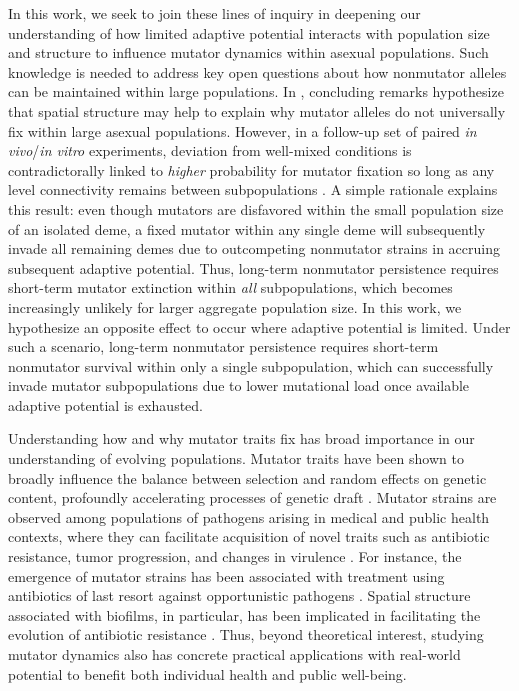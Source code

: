 In this work, we seek to join these lines of inquiry in deepening our understanding of how limited adaptive potential interacts with population size and structure to influence mutator dynamics within asexual populations.
Such knowledge is needed to address key open questions about how nonmutator alleles can be maintained within large populations.
In \citep{raynes2018sign}, concluding remarks hypothesize that spatial structure may help to explain why mutator alleles do not universally fix within large asexual populations.
However, in a follow-up set of paired \textit{in vivo}/\textit{in vitro} experiments, deviation from well-mixed conditions is contradictorally linked to \textit{higher} probability for mutator fixation so long as any level connectivity remains between subpopulations \citep{raynes2019migration}.
A simple rationale explains this result: even though mutators are disfavored within the small population size of an isolated deme, a fixed mutator within any single deme will subsequently invade all remaining demes due to outcompeting nonmutator strains in accruing subsequent adaptive potential.
Thus, long-term nonmutator persistence requires short-term mutator extinction within \textit{all} subpopulations, which becomes increasingly unlikely for larger aggregate population size.
In this work, we hypothesize an opposite effect to occur where adaptive potential is limited.
Under such a scenario, long-term nonmutator persistence requires short-term nonmutator survival within only a single subpopulation, which can successfully invade mutator subpopulations due to lower mutational load once available adaptive potential is exhausted.

Understanding how and why mutator traits fix has broad importance in our understanding of evolving populations.
Mutator traits have been shown to broadly influence the balance between selection and random effects on genetic content, profoundly accelerating processes of genetic draft \citep{couce2017mutator}.
Mutator strains are observed among populations of pathogens arising in medical and public health contexts, where they can facilitate acquisition of novel traits such as antibiotic resistance, tumor progression, and changes in virulence \citep{eliopoulos2003hypermutation,jolivetgougeon2011bacterial,stern2016viral,schlesner2015hypermutation,hammerstrom2015acinetobacter,perron2010hypermutability}.
For instance, the emergence of mutator strains has been associated with treatment using antibiotics of last resort against opportunistic pathogens \citep{mehta2019essential}.
Spatial structure associated with biofilms, in particular, has been implicated in facilitating the evolution of antibiotic resistance \citep{france2018spatial}.
Thus, beyond theoretical interest, studying mutator dynamics also has concrete practical applications with real-world potential to benefit both individual health and public well-being.

